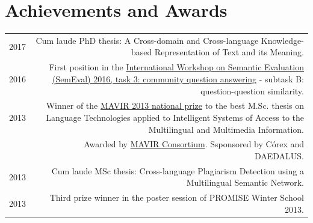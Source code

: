 \documentclass[10pt]{article}
\begin{document}
\section*{Achievements and Awards}
\begin{tabular}{L!{\VRule}R}
  2017 & Cum laude PhD thesis: A Cross-domain and Cross-language Knowledge-based Representation of Text and its Meaning.\vspace{5pt}\\
  2016 & First position in the \href{http://alt.qcri.org/semeval2016/task3/}{International Workshop on Se\-man\-tic Evaluation (SemEval) 2016, task 3: community question answering} - subtask B: question-question similarity.\vspace{5pt}\\
  2013 & Winner of the \href{http://www.mavir.net/premio/182-resuelto-premio-mavir-2013}{MAVIR 2013 national prize} to the best M.Sc. thesis on Language Technologies applied to Intelligent Systems of Access
  to the Multilingual and Multimedia Information.\vspace{5pt}\\
  &\scriptsize{Awarded by \href{http://www.mavir.net/}{MAVIR Consortium}. Ssponsored by C{\'o}rex and DAEDALUS.}\vspace{5pt}\\
  2013 & Cum laude MSc thesis: Cross-language Plagiarism Detection using a Multilingual Se\-man\-tic Network.\vspace{5pt}\\

  2013 & Third prize winner in the poster session of PROMISE Winter School 2013.\vspace{5pt}\\
\end{tabular}


\end{document}
